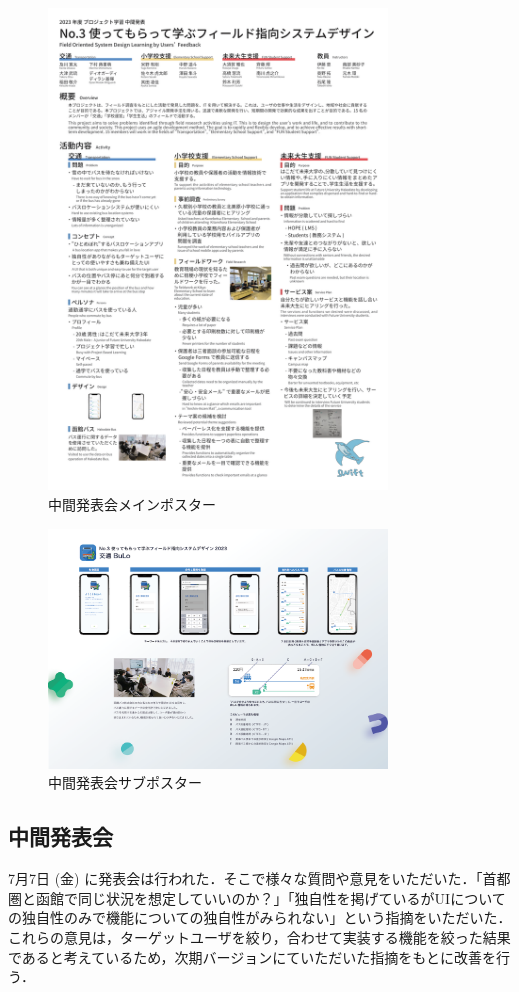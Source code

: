 \begin{figure}[H]
    \centering
    \includegraphics[width=9cm]{images/interim_poster.png}
    \caption{中間発表会メインポスター}
    \label{fig:interim_poster}
\end{figure}

\begin{figure}[H]
    \centering
    \includegraphics[width=9cm]{images/interim_poster_bulo.png}
    \caption{中間発表会サブポスター}
    \label{fig:interim_poster_bulo}
\end{figure}

\subsection{中間発表会}
7月7日 (金) に発表会は行われた．そこで様々な質問や意見をいただいた．「首都圏と函館で同じ状況を想定していいのか？」「独自性を掲げているがUIについての独自性のみで機能についての独自性がみられない」という指摘をいただいた．これらの意見は，ターゲットユーザを絞り，合わせて実装する機能を絞った結果であると考えているため，次期バージョンにていただいた指摘をもとに改善を行う．

